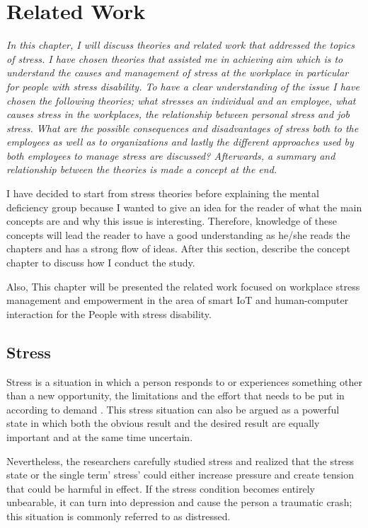 \chapter{Related Work}
\textit{In this chapter, I will discuss theories and related work that addressed the topics of stress. I have chosen theories that assisted me in achieving aim which is to understand the causes and management of stress at the workplace in particular for people with stress disability.  To have a clear understanding of the issue I have chosen the following theories; what stresses an individual and an employee, what causes stress in the workplaces,  the relationship between personal stress and job stress. What are the possible consequences and disadvantages of stress both to the employees as well as to organizations and lastly the different approaches used by both employees to manage stress are discussed?  Afterwards, a  summary  and relationship between the theories is made a concept at the end.}
\vspace{5mm}

I have decided to start  from  stress theories before explaining the mental deficiency group because  I wanted  to give  an  idea  for  the  reader  of what the main concepts are  and why  this issue is interesting. Therefore, knowledge of these concepts will lead the reader to have a good understanding as he/she reads the chapters and has a strong flow of ideas.  After this section,  describe the concept chapter to discuss how I conduct the study.

Also, This chapter will be presented the related work focused on workplace stress management and empowerment in the area of smart \ac{IoT} and human-computer interaction for the People with stress disability.
\section{Stress}
Stress is a situation in which a person responds to or experiences something other than a new opportunity, the limitations and the effort that needs to be put in according to demand \citep{Naturale2007SecondaryField} . This stress situation can also be argued as a powerful state in which both the obvious result and the desired result are equally important and at the same time uncertain.

Nevertheless, the researchers carefully studied stress and realized that the stress state or the single term' stress' could either increase pressure and create tension that could be harmful in effect. If the stress condition becomes entirely unbearable, it can turn into depression and cause the person a traumatic crash; this situation is commonly referred to as distressed. 

